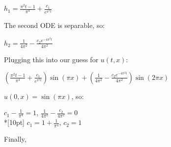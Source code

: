 \documentclass{article}
\begin{document}
\begin{center}
    \(\displaystyle h_1 = \frac{\pi^2t-1}{\pi^4}+\frac{c_1}{e^{\pi^2t}}\)
\end{center}
The second ODE is separable, so:
\begin{center}
    \(\displaystyle h_2 = \frac{1}{4\pi^2}-\frac{c_2e^{-4\pi^2t}}{4\pi^2}\)
\end{center}
Plugging this into our guess for \(u(t, x)\):
\begin{center}
    \(\displaystyle(\frac{\pi^2t-1}{\pi^4}+\frac{c_1}{e^{\pi^2t}})\sin(\pi x) + (\frac{1}{4\pi^2}-\frac{c_2e^{-4\pi^2t}}{4\pi^2})\sin(2\pi x)\)
\end{center}
\(u(0, x) = \sin (\pi x)\), so:
\begin{center}
    \(\displaystyle c_1-\frac{1}{\pi^4} = 1\), \(\displaystyle\frac{1}{4\pi^2}-\frac{c_2}{4\pi^2}=0\)\\*[10pt]
    \(\displaystyle c_1 = 1 + \frac{1}{\pi^4}\), \(c_2 = 1\)
\end{center}
Finally,
\begin{center}
\end{center}
\end{document}
